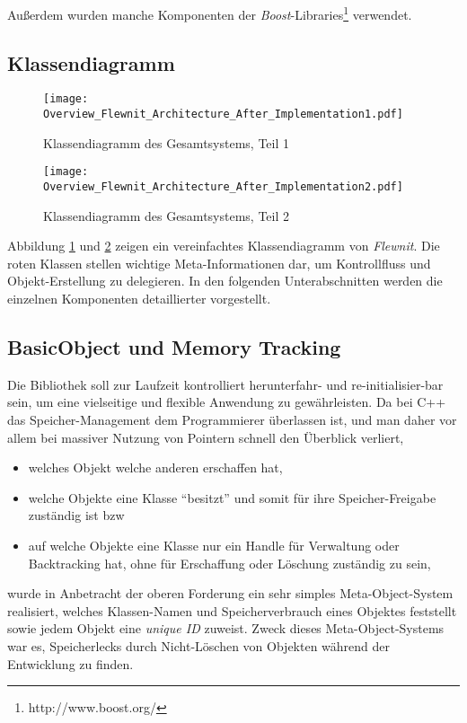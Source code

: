 	Außerdem wurden manche Komponenten der \emph{Boost}-Libraries\footnote{http://www.boost.org/} verwendet.
	
	


\subsection{Klassendiagramm}

\begin{figure}[!h]
	\texttt{[image: Overview\_Flewnit\_Architecture\_After\_Implementation1.pdf]}
	\caption{Klassendiagramm des Gesamtsystems, Teil 1}
	\label{fig:ClassDiagOverview1}
\end{figure}


\begin{figure}[!h]
	\texttt{[image: Overview\_Flewnit\_Architecture\_After\_Implementation2.pdf]}
	\caption{Klassendiagramm des Gesamtsystems, Teil 2}
	\label{fig:ClassDiagOverview2}
\end{figure}



Abbildung \ref{fig:ClassDiagOverview1} und \ref{fig:ClassDiagOverview2} zeigen ein vereinfachtes Klassendiagramm
von \emph{Flewnit}. Die roten Klassen stellen wichtige Meta-Informationen dar, um Kontrollfluss und Objekt-Erstellung
zu delegieren. In den folgenden Unterabschnitten werden die einzelnen Komponenten detaillierter vorgestellt.




 
\subsection{BasicObject und Memory Tracking}
	\lstset{language=C++} %
	
	Die Bibliothek soll zur Laufzeit kontrolliert herunterfahr- und re-initialisier-bar sein, 
	um eine vielseitige und flexible Anwendung zu gewährleisten. Da bei C++ das Speicher-Management dem
	Programmierer überlassen ist, und man daher vor allem bei massiver Nutzung von Pointern schnell den Überblick
	verliert, 
	\begin{itemize}
		\item welches Objekt welche anderen erschaffen hat,
		\item welche Objekte eine Klasse "`besitzt"' und somit für ihre Speicher-Freigabe zuständig ist bzw
		\item auf welche Objekte eine Klasse nur ein Handle für Verwaltung oder	Backtracking hat, ohne für Erschaffung
		 oder Löschung zuständig zu sein,
	\end{itemize}
	wurde in Anbetracht der oberen Forderung ein sehr simples Meta-Object-System realisiert, welches Klassen-Namen
	und Speicherverbrauch eines Objektes feststellt sowie jedem Objekt eine \emph{unique ID} zuweist.
	Zweck dieses Meta-Object-Systems war es, Speicherlecks durch Nicht-Löschen von Objekten während der Entwicklung 
	zu finden.
	

